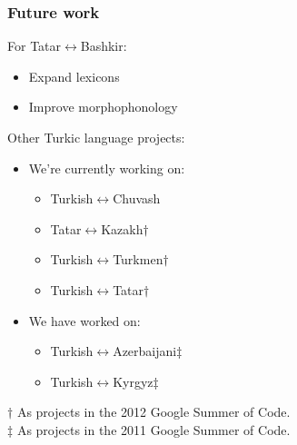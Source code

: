 \documentclass[10pt,xetex]{beamer} %
\begin{document}

\begin{frame}
  \frametitle{Future work}

\begin{block}{For Tatar$\leftrightarrow$Bashkir:}
  \begin{itemize}
    \item Expand lexicons 
    \item Improve morphophonology
  \end{itemize}
\end{block}

\begin{block}{Other Turkic language projects:}
  \begin{itemize}
    \item We're currently working on:

    \begin{itemize}
      \item Turkish$\leftrightarrow$Chuvash
      \item Tatar$\leftrightarrow$Kazakh$\dag$
      \item Turkish$\leftrightarrow$Turkmen$\dag$
      \item Turkish$\leftrightarrow$Tatar$\dag$
    \end{itemize}

    \item We have worked on: 
    \begin{itemize}
      \item Turkish$\leftrightarrow$Azerbaijani$\ddag$
      \item Turkish$\leftrightarrow$Kyrgyz$\ddag$
    \end{itemize}
  \end{itemize}
  $\dag$ As projects in the 2012 Google Summer of Code. \\
  $\ddag$ As projects in the 2011 Google Summer of Code.
\end{block}

\end{frame}
\end{document}
